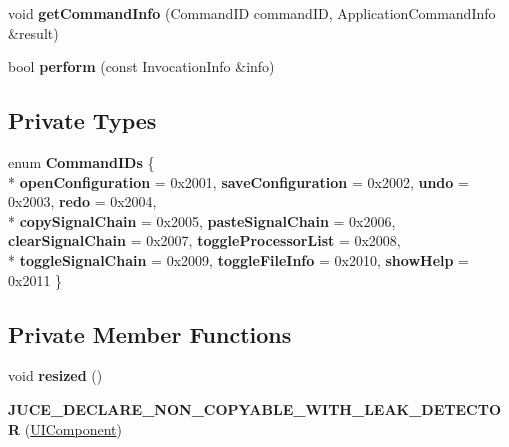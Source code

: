 \begin{DoxyCompactItemize}
\item 
\hypertarget{classUIComponent_ab375e1b7c1b1ab4640ed35f4adc9504a}{void {\bfseries get\-Command\-Info} (Command\-I\-D command\-I\-D, Application\-Command\-Info \&result)}\label{classUIComponent_ab375e1b7c1b1ab4640ed35f4adc9504a}

\item 
\hypertarget{classUIComponent_a6d87ca3ae47d93c7288689fddf5d6c51}{bool {\bfseries perform} (const Invocation\-Info \&info)}\label{classUIComponent_a6d87ca3ae47d93c7288689fddf5d6c51}

\end{DoxyCompactItemize}
\subsection*{Private Types}
\begin{DoxyCompactItemize}
\item 
enum {\bfseries Command\-I\-Ds} \{ \\*
{\bfseries open\-Configuration} =  0x2001, 
{\bfseries save\-Configuration} =  0x2002, 
{\bfseries undo} =  0x2003, 
{\bfseries redo} =  0x2004, 
\\*
{\bfseries copy\-Signal\-Chain} =  0x2005, 
{\bfseries paste\-Signal\-Chain} =  0x2006, 
{\bfseries clear\-Signal\-Chain} =  0x2007, 
{\bfseries toggle\-Processor\-List} =  0x2008, 
\\*
{\bfseries toggle\-Signal\-Chain} =  0x2009, 
{\bfseries toggle\-File\-Info} =  0x2010, 
{\bfseries show\-Help} =  0x2011
 \}
\end{DoxyCompactItemize}
\subsection*{Private Member Functions}
\begin{DoxyCompactItemize}
\item 
\hypertarget{classUIComponent_a3cf1c579fc0c309d50ffbb83c7534cc7}{void {\bfseries resized} ()}\label{classUIComponent_a3cf1c579fc0c309d50ffbb83c7534cc7}

\item 
\hypertarget{classUIComponent_a4e5869c0da489213df444e63e56580f9}{{\bfseries J\-U\-C\-E\-\_\-\-D\-E\-C\-L\-A\-R\-E\-\_\-\-N\-O\-N\-\_\-\-C\-O\-P\-Y\-A\-B\-L\-E\-\_\-\-W\-I\-T\-H\-\_\-\-L\-E\-A\-K\-\_\-\-D\-E\-T\-E\-C\-T\-O\-R} (\hyperlink{classUIComponent}{U\-I\-Component})}\label{classUIComponent_a4e5869c0da489213df444e63e56580f9}

\end{DoxyCompactItemize}
